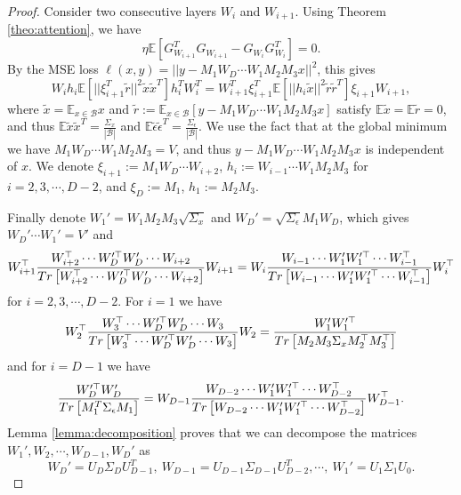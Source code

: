 \documentclass[10pt,a4paper]{amsart}
\newcommand{\E}{\mathbb{E}}
\newcommand{\Tr}{{\rm Tr}}
\begin{document}
\begin{proof}
Consider two consecutive layers $W_i$ and $W_{i+1}$. Using Theorem \ref{theo:attention}, we have
\begin{equation}
\eta\E[G_{W_{i+1}}^T G_{W_{i+1}}-G_{W_i} G_{W_i}^T]=0.
\end{equation}
By the MSE loss $\ell(x,y)=||y-M_1W_D\cdots W_1M_2M_3x||^2$, this gives
\begin{equation}
W_ih_i\mathbb{E}[||\xi_{i+1}^T\tilde{r}||^2\tilde{x}\tilde{x}^T]h_i^TW_i^T=W_{i+1}^T\xi_{i+1}^T\mathbb{E}[||h_i\tilde{x}||^2\tilde{r}\tilde{r}^T]\xi_{i+1}W_{i+1},
\end{equation}
where $\tilde{x}=\E_{x\in\mathcal{B}}x$ and $\tilde{r}:=\E_{x\in\mathcal{B}}[y-M_1W_D\cdots W_1M_2M_3x]$ satisfy $\E\tilde{x}=\E\tilde{r}=0$, and thus $\E\tilde{x}\tilde{x}^T=\frac{\Sigma_x}{|\mathcal{B}|}$ and $\E\tilde{\epsilon}\tilde{\epsilon}^T=\frac{\Sigma_\epsilon}{|\mathcal{B}|}$. We use the fact that at the global minimum we have $M_1W_D\cdots W_1M_2M_3=V$, and thus $y-M_1W_D\cdots W_1M_2M_3x$ is independent of $x$. We denote $\xi_{i+1}:=M_1W_D\cdots W_{i+2}$, $h_i:=W_{i-1}\cdots W_1M_2M_3$ for $i=2,3,\cdots,D-2$, and $\xi_D:=M_1$, $h_1:=M_2M_3$.

Finally denote $W_1'=W_1M_2M_3\sqrt{\Sigma_x}$ and $W_D'=\sqrt{\Sigma_\epsilon}M_1W_D$, which gives $W_D'\cdots W_1'=V'$ and 
\begin{equation}
W_{i+1}^{\top} \frac{W_{i+2}^{\top} \cdots W_D^{\prime \top} W_D^{\prime} \cdots W_{i+2}}{\Tr \left[W_{i+2}^{\top} \cdots W_D^{\prime \top} W_D^{\prime} \cdots W_{i+2}\right]} W_{i+1}=W_i \frac{W_{i-1} \cdots W_1^{\prime} W_1^{\prime \top} \cdots W_{i-1}^{\top}}{\Tr \left[W_{i-1} \cdots W_1^{\prime} W_1^{\prime \top} \cdots W_{i-1}^{\top}\right]} W_i^{\top}
\label{eq:eqi}
\end{equation}
for $i=2,3,\cdots,D-2$. For $i=1$ we have
\begin{equation}
W_{2}^{\top} \frac{W_{3}^{\top} \cdots W_D^{\prime \top} W_D^{\prime} \cdots W_{3}}{\Tr \left[W_{3}^{\top} \cdots W_D^{\prime \top} W_D^{\prime} \cdots W_{3}\right]} W_{2}= \frac{W_1^{\prime} W_1^{\prime \top} }{\Tr \left[M_2M_3\Sigma_x M_2^\top M_3^\top\right]} 
\label{eq:eq1}
\end{equation}
and for $i=D-1$ we have
\begin{equation}
\frac{W_D^{\prime \top} W_D^{\prime}}{\Tr \left[M_1^T\Sigma_\epsilon M_1\right]}=W_{D-1} \frac{W_{D-2} \cdots W_1^{\prime} W_1^{\prime \top} \cdots W_{D-2}^{\top}}{\Tr \left[W_{D-2} \cdots W_1^{\prime} W_1^{\prime \top} \cdots W_{D-2}^{\top}\right]} W_{D-1}^{\top}.
\label{eq:eqD}
\end{equation}
Lemma \ref{lemma:decomposition} proves that we can decompose the matrices $W_1',W_2,\cdots,W_{D-1},W_D'$ as
\begin{equation}
W_D'=U_D\Sigma_DU_{D-1}^T,\ W_{D-1}=U_{D-1}\Sigma_{D-1}U_{D-2}^T,\cdots,\ W_1'=U_1\Sigma_1U_0.
\end{equation}


\end{proof}
\end{document}
